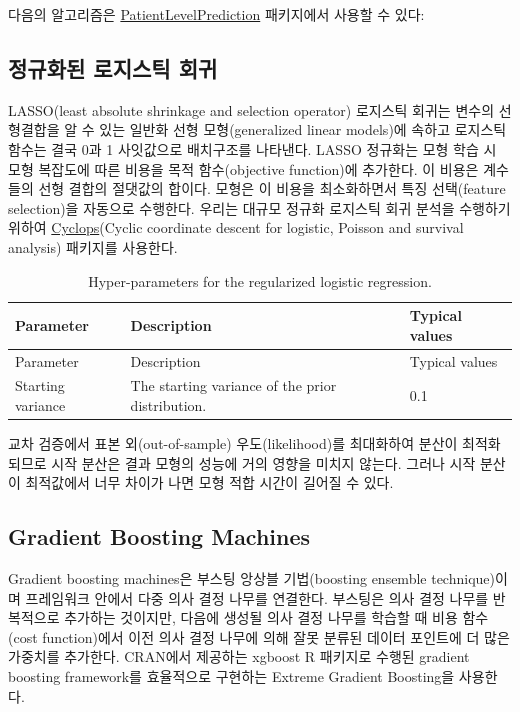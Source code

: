 \documentclass[11pt]{book}
\theoremstyle{definition}
\theoremstyle{definition}
\theoremstyle{definition}
\theoremstyle{remark}
\begin{document}
다음의 알고리즘은
\href{https://ohdsi.github.io/PatientLevelPrediction/}{PatientLevelPrediction}
패키지에서 사용할 수 있다:

\subsection{정규화된 로지스틱 회귀}\label{--}

LASSO(least absolute shrinkage and selection operator) 로지스틱 회귀는
변수의 선형결합을 알 수 있는 일반화 선형 모형(generalized linear
models)에 속하고 로지스틱 함수는 결국 0과 1 사잇값으로 배치구조를
나타낸다. LASSO 정규화는 모형 학습 시 모형 복잡도에 따른 비용을 목적
함수(objective function)에 추가한다. 이 비용은 계수들의 선형 결합의
절댓값의 합이다. 모형은 이 비용을 최소화하면서 특징 선택(feature
selection)을 자동으로 수행한다. 우리는 대규모 정규화 로지스틱 회귀
분석을 수행하기 위하여
\href{https://ohdsi.github.io/Cyclops/}{Cyclops}(Cyclic coordinate
descent for logistic, Poisson and survival analysis) 패키지를 사용한다.
  

\begin{longtable}[]{@{}lll@{}}
\caption{\label{tab:lassoParameters} Hyper-parameters for the regularized
logistic regression.}\tabularnewline
\toprule
Parameter & Description & Typical values\tabularnewline
\midrule
\endfirsthead
\toprule
Parameter & Description & Typical values\tabularnewline
\midrule
\endhead
Starting variance & The starting variance of the prior distribution. &
0.1\tabularnewline
\bottomrule
\end{longtable}

교차 검증에서 표본 외(out-of-sample) 우도(likelihood)를 최대화하여
분산이 최적화되므로 시작 분산은 결과 모형의 성능에 거의 영향을 미치지
않는다. 그러나 시작 분산이 최적값에서 너무 차이가 나면 모형 적합 시간이
길어질 수 있다.  

\subsection{Gradient Boosting
Machines}\label{gradient-boosting-machines}

Gradient boosting machines은 부스팅 앙상블 기법(boosting ensemble
technique)이며 프레임워크 안에서 다중 의사 결정 나무를 연결한다.
부스팅은 의사 결정 나무를 반복적으로 추가하는 것이지만, 다음에 생성될
의사 결정 나무를 학습할 때 비용 함수(cost function)에서 이전 의사 결정
나무에 의해 잘못 분류된 데이터 포인트에 더 많은 가중치를 추가한다.
CRAN에서 제공하는 xgboost R 패키지로 수행된 gradient boosting
framework를 효율적으로 구현하는 Extreme Gradient Boosting을 사용한다.
 
\end{document}
